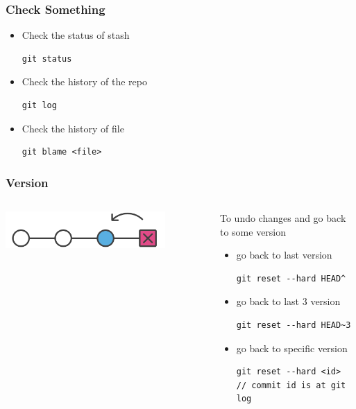 \documentclass{beamer}
\begin{document}
\begin{frame}[fragile]
    \frametitle{Check Something}
\begin{itemize}
    \item Check the status of stash
    \begin{lstlisting}[morekeywords=git]
git status
    \end{lstlisting}
    \item Check the history of the repo
    \begin{lstlisting}[morekeywords=git]
git log
    \end{lstlisting}
    \item Check the history of file
    \begin{lstlisting}[morekeywords=git]
git blame <file>
    \end{lstlisting}
\end{itemize}
\end{frame}

\begin{frame}[fragile]
    \frametitle{Version}
    \begin{columns}
        \begin{column}{0.5\textwidth}
            \centering
            \includegraphics[width=0.8\textwidth]{hero.png}
        \end{column}
        \begin{column}{0.5\textwidth}
            To undo changes and go back to some version
            \begin{itemize}
                \item go back to last version
                \begin{lstlisting}[morekeywords=git]
git reset --hard HEAD^
                \end{lstlisting}
                \item go back to last 3 version
                \begin{lstlisting}[morekeywords=git]
git reset --hard HEAD~3
                \end{lstlisting}
                \item go back to specific version
                \begin{lstlisting}[morekeywords=git]
git reset --hard <id>
// commit id is at git log
                \end{lstlisting}
            \end{itemize}
        \end{column}
    \end{columns}
\end{frame}
\end{document}
